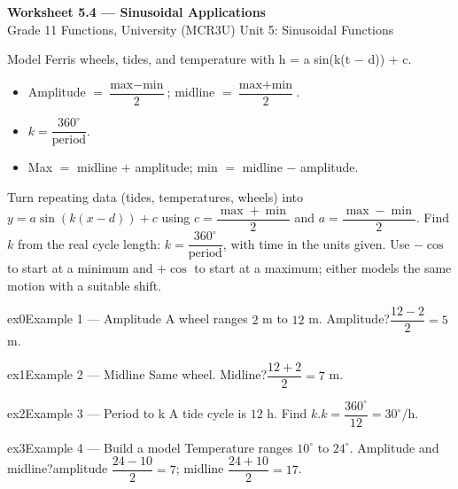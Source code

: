 \documentclass[11pt]{article}
\begin{document}
\begin{center}
{\LARGE\bfseries\color{titleblue}Worksheet 5.4 --- Sinusoidal Applications}\\[2pt]
{\small Grade 11 Functions, University (MCR3U) \textperiodcentered{} Unit 5: Sinusoidal Functions}
\end{center}

\begin{ideabox}
Model Ferris wheels, tides, and temperature with h = a sin(k(t − d)) + c.
\begin{itemize}[leftmargin=*,itemsep=2pt]
  \item Amplitude $=\dfrac{\text{max}-\text{min}}{2}$; midline $=\dfrac{\text{max}+\text{min}}{2}$.
  \item $k=\dfrac{360^\circ}{\text{period}}$.
  \item Max $=$ midline $+$ amplitude; min $=$ midline $-$ amplitude.
\end{itemize}
\end{ideabox}

\begin{learnbox}
Turn repeating data (tides, temperatures, wheels) into $y=a\sin\!\left(k(x-d)\right)+c$ using $c=\dfrac{\max+\min}{2}$ and $a=\dfrac{\max-\min}{2}$.
Find $k$ from the real cycle length: $k=\dfrac{360^\circ}{\text{period}}$, with time in the units given.
Use $-\cos$ to start at a minimum and $+\cos$ to start at a maximum; either models the same motion with a suitable shift.
\end{learnbox}


\begin{example}{ex0}{Example 1 --- Amplitude}
A wheel ranges $2$ m to $12$ m. Amplitude?\soln $\dfrac{12-2}{2}=5$ m.
\end{example}

\begin{example}{ex1}{Example 2 --- Midline}
Same wheel. Midline?\soln $\dfrac{12+2}{2}=7$ m.
\end{example}

\begin{example}{ex2}{Example 3 --- Period to k}
A tide cycle is $12$ h. Find $k$.\soln $k=\dfrac{360^\circ}{12}=30^\circ$/h.
\end{example}

\begin{example}{ex3}{Example 4 --- Build a model}
Temperature ranges $10^\circ$ to $24^\circ$. Amplitude and midline?\soln amplitude $\dfrac{24-10}{2}=7$; midline $\dfrac{24+10}{2}=17$.
\end{example}
\end{document}
